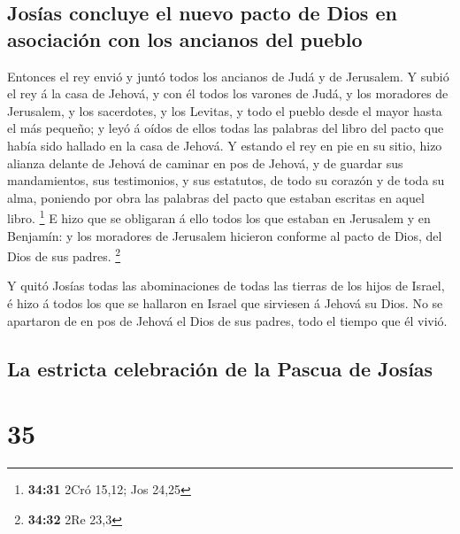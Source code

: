 \hypertarget{josuxedas-concluye-el-nuevo-pacto-de-dios-en-asociaciuxf3n-con-los-ancianos-del-pueblo}{%
\subsection{Josías concluye el nuevo pacto de Dios en asociación con los
ancianos del
pueblo}\label{josuxedas-concluye-el-nuevo-pacto-de-dios-en-asociaciuxf3n-con-los-ancianos-del-pueblo}}

 Entonces el rey envió y juntó todos los ancianos de Judá y
de Jerusalem.  Y subió el rey á la casa de Jehová, y con él
todos los varones de Judá, y los moradores de Jerusalem, y los
sacerdotes, y los Levitas, y todo el pueblo desde el mayor hasta el más
pequeño; y leyó á oídos de ellos todas las palabras del libro del pacto
que había sido hallado en la casa de Jehová.  Y estando el
rey en pie en su sitio, hizo alianza delante de Jehová de caminar en pos
de Jehová, y de guardar sus mandamientos, sus testimonios, y sus
estatutos, de todo su corazón y de toda su alma, poniendo por obra las
palabras del pacto que estaban escritas en aquel libro. \footnote{\textbf{34:31}
  2Cró 15,12; Jos 24,25}  E hizo que se obligaran á ello
todos los que estaban en Jerusalem y en Benjamín: y los moradores de
Jerusalem hicieron conforme al pacto de Dios, del Dios de sus padres.
\footnote{\textbf{34:32} 2Re 23,3}

 Y quitó Josías todas las abominaciones de todas las
tierras de los hijos de Israel, é hizo á todos los que se hallaron en
Israel que sirviesen á Jehová su Dios. No se apartaron de en pos de
Jehová el Dios de sus padres, todo el tiempo que él vivió.

\hypertarget{la-estricta-celebraciuxf3n-de-la-pascua-de-josuxedas}{%
\subsection{La estricta celebración de la Pascua de
Josías}\label{la-estricta-celebraciuxf3n-de-la-pascua-de-josuxedas}}

\hypertarget{section-34}{%
\section{35}\label{section-34}}

